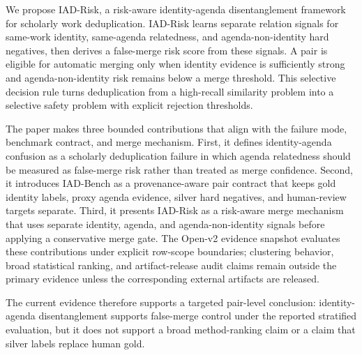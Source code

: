 \documentclass[preprint,12pt]{elsarticle}
\begin{document}
We propose IAD-Risk, a risk-aware identity-agenda disentanglement framework for scholarly work deduplication. IAD-Risk learns separate relation signals for same-work identity, same-agenda relatedness, and agenda-non-identity hard negatives, then derives a false-merge risk score from these signals. A pair is eligible for automatic merging only when identity evidence is sufficiently strong and agenda-non-identity risk remains below a merge threshold. This selective decision rule turns deduplication from a high-recall similarity problem into a selective safety problem with explicit rejection thresholds.

The paper makes three bounded contributions that align with the failure mode, benchmark contract, and merge mechanism. First, it defines identity-agenda confusion as a scholarly deduplication failure in which agenda relatedness should be measured as false-merge risk rather than treated as merge confidence. Second, it introduces IAD-Bench as a provenance-aware pair contract that keeps gold identity labels, proxy agenda evidence, silver hard negatives, and human-review targets separate. Third, it presents IAD-Risk as a risk-aware merge mechanism that uses separate identity, agenda, and agenda-non-identity signals before applying a conservative merge gate. The Open-v2 evidence snapshot evaluates these contributions under explicit row-scope boundaries; clustering behavior, broad statistical ranking, and artifact-release audit claims remain outside the primary evidence unless the corresponding external artifacts are released.

The current evidence therefore supports a targeted pair-level conclusion: identity-agenda disentanglement supports false-merge control under the reported stratified evaluation, but it does not support a broad method-ranking claim or a claim that silver labels replace human gold.
\end{document}
